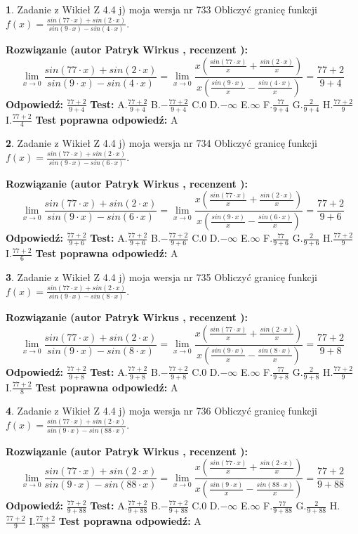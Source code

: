 \documentclass[12pt, a4paper]{article}
\theoremstyle{definition} %
\newtheorem{zad}{}
\newcommand{\zadStart}[1]{\begin{zad}#1\newline}
\newcommand{\zadStop}{\end{zad}}
\newcommand{\rozwStart}[2]{\noindent \textbf{Rozwiązanie (autor #1 , recenzent #2): }\newline}
\newcommand{\rozwStop}{\newline}
\newcommand{\odpStart}{\noindent \textbf{Odpowiedź:}\newline}
\newcommand{\odpStop}{\newline}
\newcommand{\testStart}{\noindent \textbf{Test:}\newline}
\newcommand{\testStop}{\newline}
\newcommand{\kluczStart}{\noindent \textbf{Test poprawna odpowiedź:}\newline}
\newcommand{\kluczStop}{\newline}
\begin{document}
\zadStart{Zadanie z Wikieł Z 4.4 j) moja wersja nr 733}
Obliczyć granicę funkcji $f(x)=\frac{sin(77\cdot x) +sin(2\cdot x)}{sin(9\cdot x) -sin(4\cdot x)}$.
\zadStop
\rozwStart{Patryk Wirkus}{}
$$\lim\limits_{x\to 0}\frac{sin(77\cdot x) +sin(2\cdot x)}{sin(9\cdot x) -sin(4\cdot x)}=\lim\limits_{x\to 0}\frac{x(\frac{sin(77\cdot x)}{x}+\frac{sin(2\cdot x)}{x})}{x(\frac{sin(9\cdot x)}{x}-\frac{sin(4\cdot x)}{x})}=\frac{77+2}{9+4}$$
\rozwStop
\odpStart
$\frac{77+2}{9+4}$
\odpStop
\testStart
A.$\frac{77+2}{9+4}$
B.$-\frac{77+2}{9+4}$
C.$0$
D.$-\infty$
E.$\infty$
F.$\frac{77}{9+4}$
G.$\frac{2}{9+4}$
H.$\frac{77+2}{9}$
I.$\frac{77+2}{4}$
\testStop
\kluczStart
A
\kluczStop



\zadStart{Zadanie z Wikieł Z 4.4 j) moja wersja nr 734}
Obliczyć granicę funkcji $f(x)=\frac{sin(77\cdot x) +sin(2\cdot x)}{sin(9\cdot x) -sin(6\cdot x)}$.
\zadStop
\rozwStart{Patryk Wirkus}{}
$$\lim\limits_{x\to 0}\frac{sin(77\cdot x) +sin(2\cdot x)}{sin(9\cdot x) -sin(6\cdot x)}=\lim\limits_{x\to 0}\frac{x(\frac{sin(77\cdot x)}{x}+\frac{sin(2\cdot x)}{x})}{x(\frac{sin(9\cdot x)}{x}-\frac{sin(6\cdot x)}{x})}=\frac{77+2}{9+6}$$
\rozwStop
\odpStart
$\frac{77+2}{9+6}$
\odpStop
\testStart
A.$\frac{77+2}{9+6}$
B.$-\frac{77+2}{9+6}$
C.$0$
D.$-\infty$
E.$\infty$
F.$\frac{77}{9+6}$
G.$\frac{2}{9+6}$
H.$\frac{77+2}{9}$
I.$\frac{77+2}{6}$
\testStop
\kluczStart
A
\kluczStop



\zadStart{Zadanie z Wikieł Z 4.4 j) moja wersja nr 735}
Obliczyć granicę funkcji $f(x)=\frac{sin(77\cdot x) +sin(2\cdot x)}{sin(9\cdot x) -sin(8\cdot x)}$.
\zadStop
\rozwStart{Patryk Wirkus}{}
$$\lim\limits_{x\to 0}\frac{sin(77\cdot x) +sin(2\cdot x)}{sin(9\cdot x) -sin(8\cdot x)}=\lim\limits_{x\to 0}\frac{x(\frac{sin(77\cdot x)}{x}+\frac{sin(2\cdot x)}{x})}{x(\frac{sin(9\cdot x)}{x}-\frac{sin(8\cdot x)}{x})}=\frac{77+2}{9+8}$$
\rozwStop
\odpStart
$\frac{77+2}{9+8}$
\odpStop
\testStart
A.$\frac{77+2}{9+8}$
B.$-\frac{77+2}{9+8}$
C.$0$
D.$-\infty$
E.$\infty$
F.$\frac{77}{9+8}$
G.$\frac{2}{9+8}$
H.$\frac{77+2}{9}$
I.$\frac{77+2}{8}$
\testStop
\kluczStart
A
\kluczStop



\zadStart{Zadanie z Wikieł Z 4.4 j) moja wersja nr 736}
Obliczyć granicę funkcji $f(x)=\frac{sin(77\cdot x) +sin(2\cdot x)}{sin(9\cdot x) -sin(88\cdot x)}$.
\zadStop
\rozwStart{Patryk Wirkus}{}
$$\lim\limits_{x\to 0}\frac{sin(77\cdot x) +sin(2\cdot x)}{sin(9\cdot x) -sin(88\cdot x)}=\lim\limits_{x\to 0}\frac{x(\frac{sin(77\cdot x)}{x}+\frac{sin(2\cdot x)}{x})}{x(\frac{sin(9\cdot x)}{x}-\frac{sin(88\cdot x)}{x})}=\frac{77+2}{9+88}$$
\rozwStop
\odpStart
$\frac{77+2}{9+88}$
\odpStop
\testStart
A.$\frac{77+2}{9+88}$
B.$-\frac{77+2}{9+88}$
C.$0$
D.$-\infty$
E.$\infty$
F.$\frac{77}{9+88}$
G.$\frac{2}{9+88}$
H.$\frac{77+2}{9}$
I.$\frac{77+2}{88}$
\testStop
\kluczStart
A
\kluczStop
\end{document}
